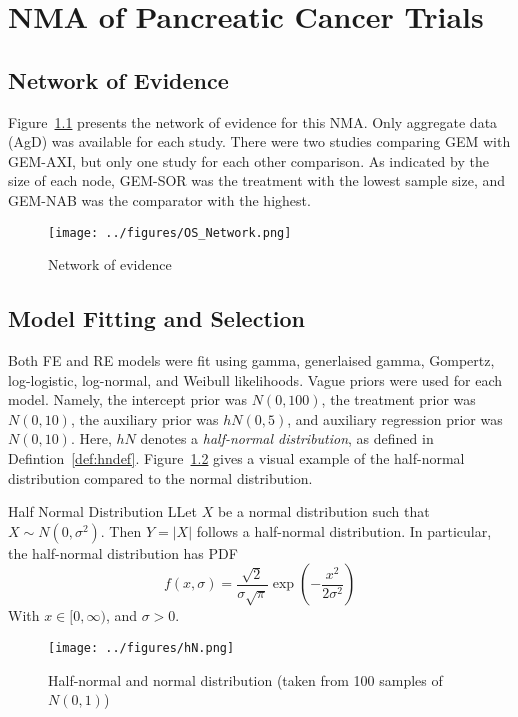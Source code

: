 \chapter{NMA of Pancreatic Cancer Trials}

\section{Network of Evidence}
Figure~\ref{fig:osnet} presents the network of evidence for this NMA. Only aggregate data (AgD) was available for each study. There were two studies comparing GEM with GEM-AXI, but only one study for each other comparison. As indicated by the size of each node, GEM-SOR was the treatment with the lowest sample size, and GEM-NAB was the comparator with the highest.

\begin{figure}[h]
    \centering
    \texttt{[image: ../figures/OS\_Network.png]}
    \caption{Network of evidence}
    \label{fig:osnet}
\end{figure}

\section{Model Fitting and Selection}
Both FE and RE models were fit using gamma, generlaised gamma, Gompertz, log-logistic, log-normal, and Weibull likelihoods. Vague priors were used for each model. Namely, the intercept prior was $N(0, 100)$, the treatment prior was $N(0, 10)$, the auxiliary prior was $hN(0, 5)$, and auxiliary regression prior was $N(0, 10)$. Here, $hN$ denotes a \textit{half-normal distribution}, as defined in Defintion~\ref{def:hndef}. Figure~\ref{fig:hn} gives a visual example of the half-normal distribution compared to the normal distribution.

\begin{definition}{Half Normal Distribution}
    LLet $X$ be a normal distribution such that $X \sim N(0, \sigma^2)$. Then $Y = |X|$ follows a half-normal distribution. In particular, the half-normal distribution has PDF 
    \[
        f(x, \sigma) = \frac{\sqrt{2}}{\sigma \sqrt{\pi}}\exp \left(-\frac{x^2}{2\sigma^2}\right)    
    \]
    With $x \in [0, \infty)$, and $\sigma > 0$.
    \label{def:hndef}
\end{definition}

\begin{figure}[h]
    \centering
    \texttt{[image: ../figures/hN.png]}
    \caption{Half-normal and normal distribution (taken from 100 samples of $N(0,1)$)}
    \label{fig:hn}
\end{figure}


